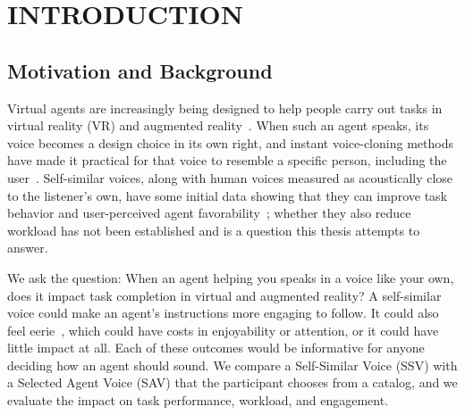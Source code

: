 \chapter{INTRODUCTION}
\label{ch:introduction}
\section{Motivation and Background}
Virtual agents are increasingly being designed to help people carry out tasks in virtual reality (VR) and augmented reality~\cite{bovo2025embardiment,madritsch2026assistance,venkatakrishnan2026clarifying}. When such an agent speaks, its voice becomes a design choice in its own right, and instant voice-cloning methods have made it practical for that voice to resemble a specific person, including the user~\cite{qin2023openvoice}. Self-similar voices, along with human voices measured as acoustically close to the listener's own, have some initial data showing that they can improve task behavior and user-perceived agent favorability~\cite{kao2021selfsimilar,jaggy2025similarity,guo2024doppelganger}; whether they also reduce workload has not been established and is a question this thesis attempts to answer.

We ask the question: When an agent helping you speaks in a voice like your own, does it impact task completion in virtual and augmented reality? A self-similar voice could make an agent's instructions more engaging to follow. It could also feel eerie~\cite{guo2024doppelganger}, which could have costs in enjoyability or attention, or it could have little impact at all. Each of these outcomes would be informative for anyone deciding how an agent should sound. We compare a Self-Similar Voice (SSV) with a Selected Agent Voice (SAV) that the participant chooses from a catalog, and we evaluate the impact on task performance, workload, and engagement.

